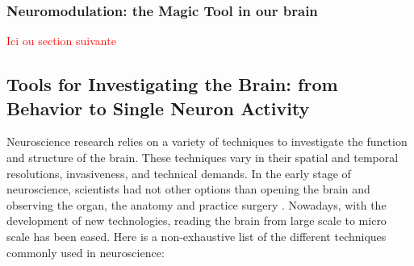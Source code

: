 \subsubsection{Neuromodulation: the Magic Tool in our brain}
\textcolor{red}{Ici ou section suivante}



\subsection{Tools for Investigating the Brain: from Behavior to Single Neuron Activity}
Neuroscience research relies on a variety of techniques to investigate the function and structure of the brain. These techniques vary in their spatial and temporal resolutions, invasiveness, and technical demands. In the early stage of neuroscience, scientists had not other options than opening the brain and observing the organ, the anatomy and practice surgery \citep{buzsaki_rhythms_2009}. Nowadays, with the development of new technologies, reading the brain from large scale to micro scale has been eased. Here is a non-exhaustive list of the different techniques commonly used in neuroscience:

